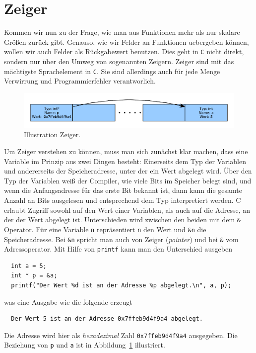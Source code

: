 
\section{Zeiger}\label{sec:zeiger}

Kommen wir nun zu der Frage, wie man aus Funktionen mehr als nur skalare Größen zurück gibt.
Genauso, wie wir Felder an Funktionen uebergeben können, wollen wir auch Felder als Rückgabewert benutzen.
Dies geht in \texttt{C} nicht direkt, sondern nur über den Umweg von sogenannten Zeigern.
Zeiger sind mit das mächtigste Sprachelement in \texttt{C}.
Sie sind allerdings auch für jede Menge Verwirrung und Programmierfehler verantworlich.

\begin{figure}[h]
  \centering
  \includegraphics[width=\linewidth]{graphics/zeiger}
  \caption{\label{fig:zeiger} Illustration Zeiger.}
\end{figure}

Um Zeiger verstehen zu können, muss man sich zunächst klar machen, dass eine Variable im Prinzip aus zwei Dingen besteht:
Einerseits dem Typ der Variablen und andererseits der Speicheradresse, unter der ein Wert abgelegt wird.
Über den Typ der Variablen weiß der Compiler, wie viele Bits im Speicher belegt sind, und wenn die Anfangsadresse für das erste Bit bekannt ist, dann kann die gesamte Anzahl an Bits ausgelesen und entsprechend dem Typ interpretiert werden.
C erlaubt Zugriff sowohl auf den Wert einer Variablen, als auch auf die Adresse, an der der Wert abgelegt ist.
Unterschieden wird zwischen den beiden mit dem \verb|&| Operator.
Für eine Variable \verb|n| repräsentiert \verb|n| den Wert und \verb|&n| die Speicheradresse.
Bei \verb|&n| spricht man auch von Zeiger (\emph{pointer}) und bei \verb|&| vom Adressoperator.\index{\&}
Mit Hilfe von \texttt{printf} kann man den Unterschied ausgeben
\begin{lstlisting}
  int a = 5;
  int * p = &a;
  printf("Der Wert %d ist an der Adresse %p abgelegt.\n", a, p);
\end{lstlisting}
was eine Ausgabe wie die folgende erzeugt
\begin{verbatim}
  Der Wert 5 ist an der Adresse 0x7ffeb9d4f9a4 abgelegt.
\end{verbatim}
Die Adresse wird hier als \emph{hexadezimal} Zahl \verb|0x7ffeb9d4f9a4| ausgegeben.
Die Beziehung von \verb|p| und \verb|a| ist in Abbildung~\ref{fig:zeiger} illustriert.

